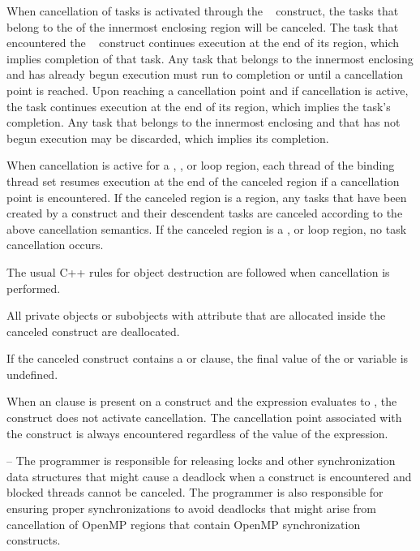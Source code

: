 {{{{When cancellation of tasks is activated through the
~ construct, the tasks that belong to the
 of the innermost enclosing  region
will be canceled. The task that encountered the
~ construct continues execution at the
end of its  region, which implies completion of that
task. Any task that belongs to the innermost enclosing
 and has already begun execution must run to
completion or until a cancellation point is reached. Upon reaching a
cancellation point and if cancellation is active, the task continues
execution at the end of its  region, which implies the
task's completion. Any task that belongs to the innermost enclosing
 and that has not begun execution may be discarded,
which implies its completion.

When cancellation is active for a , , or loop region, each 
thread of the binding thread set resumes execution at the end of the canceled region if a 
cancellation point is encountered. If the canceled region is a  region, any 
tasks that have been created by a  construct and their descendent tasks are 
canceled according to the above  cancellation semantics. If the canceled 
region is a , or loop region, no task cancellation occurs.

\cppspecificstart
The usual C++ rules for object destruction are followed when cancellation is performed.
\cppspecificend

\fortranspecificstart
All private objects or subobjects with  attribute that are allocated inside 
the canceled construct are deallocated.
\fortranspecificend

If the canceled construct contains a  or  clause, the final 
value of the  or  variable is undefined.

When an  clause is present on a  construct and the  expression evaluates 
to , the  construct does not activate cancellation. The cancellation point 
associated with the  construct is always encountered regardless of the value of 
the  expression.

\notestart
\noteheader – The programmer is responsible for releasing locks and
other synchronization data structures that might cause a deadlock when
a  construct is encountered and blocked threads cannot be
canceled. The programmer is also responsible for ensuring proper
synchronizations to avoid deadlocks that might arise from cancellation
of OpenMP regions that contain OpenMP synchronization constructs.
\noteend

}}}}

